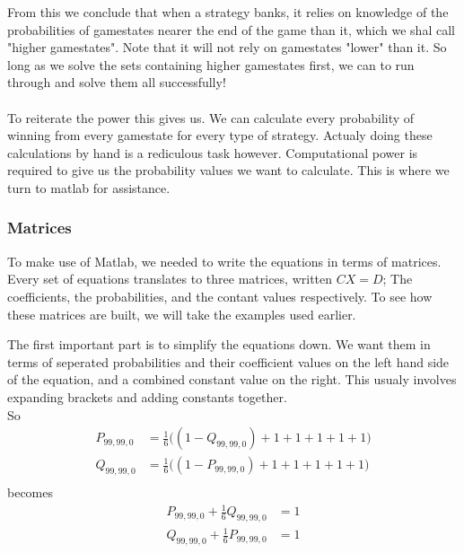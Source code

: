 \documentclass[a4paper,titlepage]{article}
\begin{document}
From this we conclude that when a strategy banks, it relies on knowledge of the probabilities of gamestates nearer the end of the game than it, which we shal call "higher gamestates".
Note that it will not rely on gamestates "lower" than it.
So long as we solve the sets containing higher gamestates first, we can to run through and solve them all successfully!
\\
\\
To reiterate the power this gives us. We can calculate every probability of winning from every gamestate for every type of strategy. Actualy doing these calculations by hand is a rediculous task however.
Computational power is required to give us the probability values we want to calculate. This is where we turn to matlab for assistance.

\subsubsection{Matrices}
To make use of Matlab, we needed to write the equations in terms of matrices.
Every set of equations translates to three matrices, written $CX=D$; The coefficients, the probabilities, and the contant values respectively.
To see how these matrices are built, we will take the examples used earlier.

The first important part is to simplify the equations down. We want them in terms of seperated probabilities and their coefficient values on the left hand side of the equation, and a combined constant value on the right.
This usualy involves expanding brackets and adding constants together.\\
So
\begin{align*}
	P_{99,99,0} &= \frac{1}{6}\bigg((1 - Q_{99,99,0}) + 1 + 1 + 1 + 1 + 1\bigg)\\
	Q_{99,99,0} &= \frac{1}{6}\bigg((1 - P_{99,99,0}) + 1 + 1 + 1 + 1 + 1\bigg)\\
\end{align*}
becomes
\begin{align*}
	P_{99,99,0} + \frac{1}{6}Q_{99,99,0} &= 1\\
	Q_{99,99,0} + \frac{1}{6}P_{99,99,0} &= 1
\end{align*}
\end{document}
